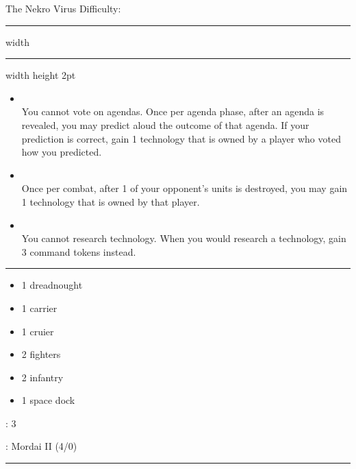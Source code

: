 \newpage
{\handel\Huge The Nekro Virus} \hfill {\Large Difficulty: \hard} \vspace{-4pt}\\
\hrule width \hsize \kern 1mm \hrule width \hsize height 2pt


\begin{multicols}{2}


\begin{itemize}
\item {}\\
You cannot vote on agendas. Once per agenda phase, after an agenda is revealed, you may predict aloud the outcome of that agenda. If your prediction is correct, gain 1 technology that is owned by a player who voted how you predicted.
\item {}\\
Once per combat, after 1 of your opponent's units is destroyed, you may gain 1 technology that is owned by that player.
\item {}\\
You cannot research technology. When you would research a technology, gain 3 command tokens instead.
\end{itemize}


\vspace{-10pt}\rule{\hsize}{0.4pt}\vspace{5pt}


\vspace{-5pt}
\begin{multicols}{2}
\begin{itemize}
\item 1 dreadnought
\item 1 carrier
\item 1 cruier
\item 2 fighters
\item 2 infantry
\item 1 space dock
\end{itemize}
\end{multicols}

\vspace{-5pt}
: 3

\vspace{2pt}
: Mordai II (4/0)

\rule{\hsize}{0.4pt}\vspace{5pt}


\end{multicols}
